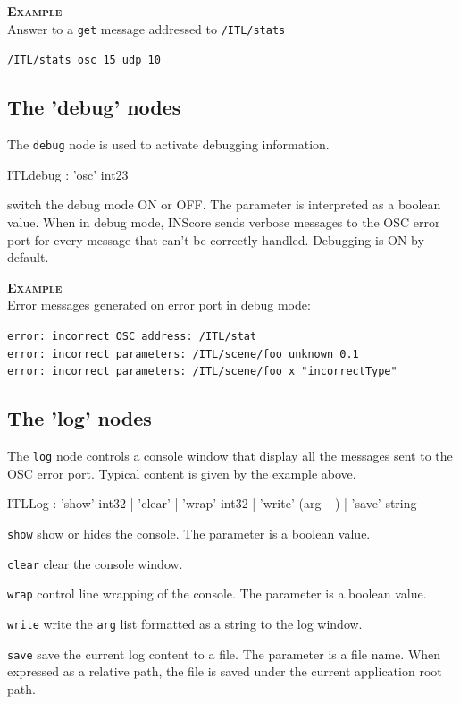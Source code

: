 \documentclass[a4paper,twoside]{report}
\newcommand{\subsublevel}[1]	{\subsection{#1}}
\newcommand{\OSC}[1]		{\texttt{#1}}
\newcommand{\example}		{\textbf{\hspace{-1.5cm}\textbf{\textsc{Example }}}}
\let\olditemize\itemize
\let\oldenditemize\enditemize
\renewenvironment{itemize} 	{\olditemize \setlength{\itemsep}{1mm}}{\oldenditemize}
\newcommand{\sample}	[1]			{\vspace{-2mm}\begin{center}\colorbox{mygrey}{
								\begin{minipage}[t]{0.9\columnwidth} 
								{\small \texttt{#1}}
								\end{minipage}}\end{center}}
\begin{document}
\example \\
Answer to a \OSC{get} message addressed to \OSC{/ITL/stats}
\sample{/ITL/stats osc 15 udp 10}


\subsublevel{The 'debug' nodes}
\label{ITLdebug}

The \OSC{debug} node is used to activate debugging information.
\begin{rail}
ITLdebug : 'osc' int23
\end{rail}

\begin{itemize}
\item switch the debug mode ON or OFF. The parameter is interpreted as a boolean value. When in debug mode, INScore sends verbose messages to the OSC error port for every message that can't be correctly handled. Debugging is ON by default.
\end{itemize}

\example \\
Error messages generated on error port in debug mode:
\sample{error:  incorrect OSC address: /ITL/stat\\
error:  incorrect parameters: /ITL/scene/foo unknown 0.1\\
error:  incorrect parameters: /ITL/scene/foo x "incorrectType"
}


\subsublevel{The 'log' nodes}
\label{ITLlog}

The \OSC{log} node controls a console window that display all the messages sent to the OSC error port. Typical content is given by the example above.

\begin{rail}
ITLLog : 'show'  int32
		| 'clear'
		| 'wrap' int32
		| 'write' (arg +)
		| 'save' string
\end{rail}

\begin{itemize}
\item \OSC{show} show or hides the console. The parameter is a boolean value.
\item \OSC{clear} clear the console window.
\item \OSC{wrap} control line wrapping of the console. The parameter is a boolean value.
\item \OSC{write} write the \OSC{arg} list formatted as a string to the log window.
\item \OSC{save} save the current log content to a file. The parameter is a file name. When expressed as a relative path, the file is saved under the current application root path.
\end{itemize}
\end{document}
